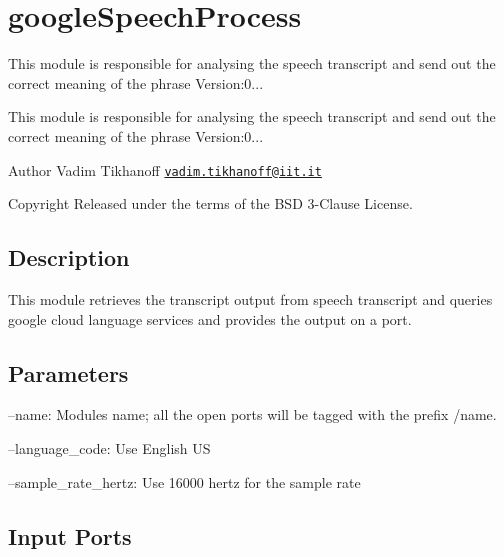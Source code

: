 \section{google\+Speech\+Process}
\label{group__googleSpeechProcess}


This module is responsible for analysing the speech transcript and send out the correct meaning of the phrase Version\+:0...  


This module is responsible for analysing the speech transcript and send out the correct meaning of the phrase Version\+:0... 

\begin{DoxyAuthor}{Author}
Vadim Tikhanoff \href{mailto:vadim.tikhanoff@iit.it}{\tt vadim.\+tikhanoff@iit.\+it} ~\newline
 
\end{DoxyAuthor}
\begin{DoxyCopyright}{Copyright}
Released under the terms of the B\+SD 3-\/\+Clause License. 
\end{DoxyCopyright}
\hypertarget{group__skeletonViewer_intro_sec}{}\subsection{Description}\label{group__skeletonViewer_intro_sec}
This module retrieves the transcript output from speech transcript and queries google cloud language services and provides the output on a port.\hypertarget{group__skeletonViewer_parameters_sec}{}\subsection{Parameters}\label{group__skeletonViewer_parameters_sec}

\begin{DoxyItemize}
\item --name\+: Module\textquotesingle{}s name; all the open ports will be tagged with the prefix /name.
\item --language\+\_\+code\+: Use English US
\item --sample\+\_\+rate\+\_\+hertz\+: Use 16000 hertz for the sample rate 
\end{DoxyItemize}\hypertarget{group__skeletonViewer_inputports_sec}{}\subsection{Input Ports}\label{group__skeletonViewer_inputports_sec}

